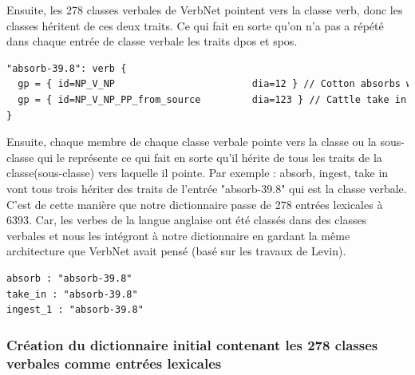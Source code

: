 Ensuite, les 278 classes verbales de VerbNet pointent vers la classe verb, donc les classes héritent de ces deux traits. Ce qui fait en sorte qu'on n'a pas a répété dans chaque entrée de classe verbale les traits dpos et spos. 

\begin{lstlisting}[language=XML]
"absorb-39.8": verb {
  gp = { id=NP_V_NP                        dia=12 } // Cotton absorbs water.
  gp = { id=NP_V_NP_PP_from_source         dia=123 } // Cattle take in nutrients from their feed.
}
\end{lstlisting}

Ensuite, chaque membre de chaque classe verbale pointe vers la classe ou la sous-classe qui le représente ce qui fait en sorte qu'il hérite de tous les traits de la classe(sous-classe) vers laquelle il pointe. Par exemple : absorb, ingest, take in vont tous trois hériter des traits de l'entrée "absorb-39.8" qui est la classe verbale. C'est de cette manière que notre dictionnaire passe de 278 entrées lexicales à 6393. Car, les verbes de la langue anglaise ont été classés dans des classes verbales et nous les intégront à notre dictionnaire en gardant la même architecture que VerbNet avait pensé (basé sur les travaux de Levin).

\begin{lstlisting}[language=XML]
absorb : "absorb-39.8"
take_in : "absorb-39.8"
ingest_1 : "absorb-39.8"
\end{lstlisting}

\subsubsection{Création du dictionnaire initial contenant les 278 classes verbales comme entrées lexicales}

